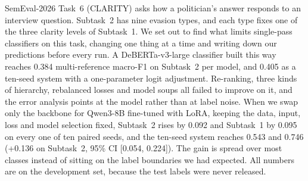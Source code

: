 SemEval-2026 Task~6 (CLARITY) asks how a politician's answer responds to an interview question.
Subtask~2 has nine evasion types, and each type fixes one of the three clarity levels of Subtask~1.
We set out to find what limits single-pass classifiers on this task, changing one thing at a time and writing down our predictions before every run.
A DeBERTa-v3-large classifier built this way reaches 0.384 multi-reference macro-F1 on Subtask~2 per model, and 0.405 as a ten-seed system with a one-parameter logit adjustment.
Re-ranking, three kinds of hierarchy, rebalanced losses and model soups all failed to improve on it, and the error analysis points at the model rather than at label noise.
When we swap only the backbone for Qwen3-8B fine-tuned with LoRA, keeping the data, input, loss and model selection fixed, Subtask~2 rises by 0.092 and Subtask~1 by 0.095 on every one of ten paired seeds, and the ten-seed system reaches 0.543 and 0.746 (+0.136 on Subtask~2, 95\% CI [0.054, 0.224]).
The gain is spread over most classes instead of sitting on the label boundaries we had expected.
All numbers are on the development set, because the test labels were never released.
